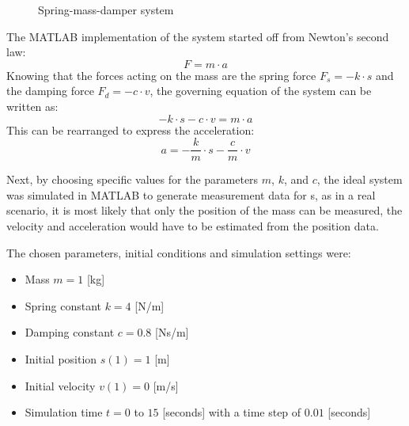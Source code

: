 ﻿\documentclass[12pt,a4paper]{article}
\begin{document}
\begin{figure}[H]
    \centering
    \caption{Spring-mass-damper system}
    \label{fig:spring-mass}
\end{figure}

The MATLAB implementation of the system started off from Newton's second law:
\begin{equation}
    F = m \cdot a
\end{equation}
Knowing that the forces acting on the mass are the spring force $F_s = -k \cdot s$ and
the damping force $F_d = -c \cdot v$, the governing equation of the system can be written as:
\begin{equation}
    -k \cdot s - c \cdot v = m \cdot a
\end{equation}
This can be rearranged to express the acceleration:
\begin{equation}
    a = -\frac{k}{m} \cdot s - \frac{c}{m} \cdot v
\end{equation}

Next, by choosing specific values for the parameters $m$, $k$, and $c$, the ideal
system was simulated in MATLAB to generate measurement data for s, as in a real scenario,
it is most likely that only the position of the mass can be measured, the velocity and
acceleration would have to be estimated from the position data.\par
The chosen parameters, initial conditions and simulation settings were:
\begin{itemize}
    \item Mass $m = 1$ [kg]
    \item Spring constant $k = 4$ [N/m]
    \item Damping constant $c = 0.8$ [Ns/m]
    \item Initial position $s(1) = 1$ [m]
    \item Initial velocity $v(1) = 0$ [m/s]
    \item Simulation time $t = 0$ to $15$ [seconds] with a time step of $0.01$ [seconds]
\end{itemize}
\end{document}

